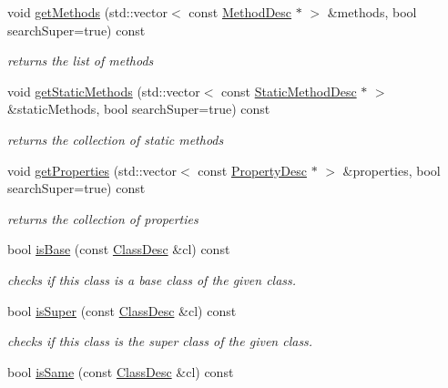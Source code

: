 \begin{DoxyCompactItemize}
void \hyperlink{classagm_1_1reflection_1_1_class_desc_a8ef400d0269cb30a83234fdf1d93da66}{get\+Methods} (std\+::vector$<$ const \hyperlink{classagm_1_1reflection_1_1_method_desc}{Method\+Desc} $\ast$ $>$ \&methods, bool search\+Super=true) const 
\begin{DoxyCompactList}\small\item\em returns the list of methods \end{DoxyCompactList}\item 
void \hyperlink{classagm_1_1reflection_1_1_class_desc_aaade1571e93398946b0c73861692bfb8}{get\+Static\+Methods} (std\+::vector$<$ const \hyperlink{classagm_1_1reflection_1_1_static_method_desc}{Static\+Method\+Desc} $\ast$ $>$ \&static\+Methods, bool search\+Super=true) const 
\begin{DoxyCompactList}\small\item\em returns the collection of static methods \end{DoxyCompactList}\item 
void \hyperlink{classagm_1_1reflection_1_1_class_desc_a47f0213bce8ded61eb98d65bee1162e1}{get\+Properties} (std\+::vector$<$ const \hyperlink{classagm_1_1reflection_1_1_property_desc}{Property\+Desc} $\ast$ $>$ \&properties, bool search\+Super=true) const 
\begin{DoxyCompactList}\small\item\em returns the collection of properties \end{DoxyCompactList}\item 
bool \hyperlink{classagm_1_1reflection_1_1_class_desc_a2d3a8db9a6838de15dc83a256f9a92a7}{is\+Base} (const \hyperlink{classagm_1_1reflection_1_1_class_desc}{Class\+Desc} \&cl) const 
\begin{DoxyCompactList}\small\item\em checks if this class is a base class of the given class. \end{DoxyCompactList}\item 
bool \hyperlink{classagm_1_1reflection_1_1_class_desc_a0620358297c4bd94e5c78f5b14b75d89}{is\+Super} (const \hyperlink{classagm_1_1reflection_1_1_class_desc}{Class\+Desc} \&cl) const 
\begin{DoxyCompactList}\small\item\em checks if this class is the super class of the given class. \end{DoxyCompactList}\item 
bool \hyperlink{classagm_1_1reflection_1_1_class_desc_ad563b5f93e7eac41b5d8ca3e97d01be4}{is\+Same} (const \hyperlink{classagm_1_1reflection_1_1_class_desc}{Class\+Desc} \&cl) const 

\end{DoxyCompactItemize}
